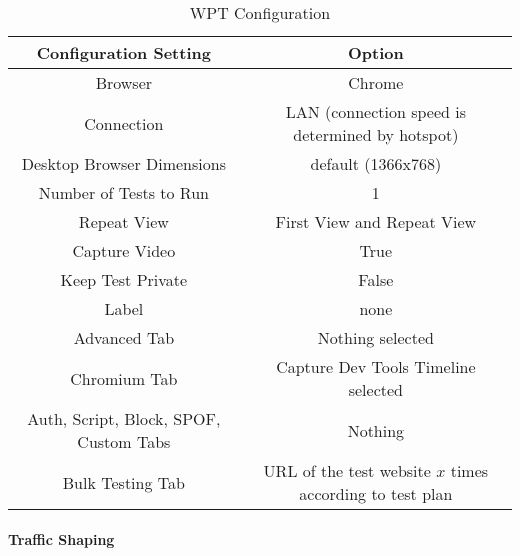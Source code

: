 



\begin{table}[h]
	\small
	\centering
	\begin{tabular}{  | c | c | } 
	\hline
	\cellcolor{lightgrey} Configuration Setting & \cellcolor{lightgrey} Option \\
	\hline
	Browser & Chrome \\
	\hline
	Connection & LAN (connection speed is determined by hotspot) \\
	Desktop Browser Dimensions & default (1366x768) \\
	Number of Tests to Run & 1 \\
	Repeat View & First View and Repeat View \\
	Capture Video & True \\
	Keep Test Private & False \\
	Label & none \\
	\hline	  
	Advanced Tab & Nothing selected \\
	Chromium Tab & Capture Dev Tools Timeline selected  \\
	Auth, Script, Block, SPOF, Custom Tabs & Nothing  \\
	Bulk Testing Tab & URL of the test website $x$ times according to test plan \\
	\hline
	\end{tabular}
	\medskip
	\caption{WPT Configuration}
	\label{table:wpt_configuration}
\end{table}






\paragraph{Traffic Shaping}





